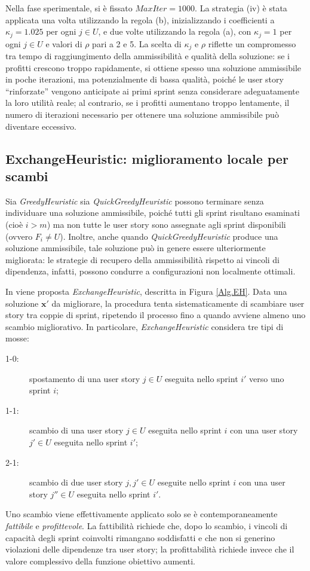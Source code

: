 \documentclass[12pt,a4paper,openright,twoside]{book}
\begin{document}
Nella fase sperimentale, si è fissato $\textit{MaxIter}=1000$. La strategia (iv) è stata applicata una volta utilizzando la regola (b), inizializzando i coefficienti a $\kappa_j = 1.025$ per ogni $j \in U$, e due volte utilizzando la regola (a), con $\kappa_j = 1$ per ogni $j \in U$ e valori di $\rho$ pari a 2 e 5. La scelta di $\kappa_j$ e $\rho$ riflette un compromesso tra tempo di raggiungimento della ammissibilità e qualità della soluzione: se i profitti crescono troppo rapidamente, si ottiene spesso una soluzione ammissibile in poche iterazioni, ma potenzialmente di bassa qualità, poiché le user story ``rinforzate'' vengono anticipate ai primi sprint senza considerare adeguatamente la loro utilità reale; al contrario, se i profitti aumentano troppo lentamente, il numero di iterazioni necessario per ottenere una soluzione ammissibile può diventare eccessivo.


\subsection{ExchangeHeuristic: miglioramento locale per scambi}

Sia {\em GreedyHeuristic} sia {\em QuickGreedyHeuristic} possono terminare senza individuare una soluzione ammissibile, poiché tutti gli sprint risultano esaminati (cioè $i > m$) ma non tutte le user story sono assegnate agli sprint disponibili (ovvero $F_i \neq U$). Inoltre, anche quando {\em QuickGreedyHeuristic} produce una soluzione ammissibile, tale soluzione può in genere essere ulteriormente migliorata: le strategie di recupero della ammissibilità rispetto ai vincoli di dipendenza, infatti, possono condurre a configurazioni non localmente ottimali.

In \cite{BOSCHETTI2014116} viene proposta \emph{ExchangeHeuristic}, descritta in Figura \ref{Alg.EH}. Data una soluzione $\mathbf{x}'$ da migliorare, la procedura tenta sistematicamente di scambiare user story tra coppie di sprint, ripetendo il processo fino a quando avviene almeno uno scambio migliorativo. In particolare, {\em ExchangeHeuristic} considera tre tipi di mosse:
\begin{description}
\item[1-0:] spostamento di una user story $j \in U$ eseguita nello sprint $i'$ verso uno sprint $i$;
\item[1-1:] scambio di una user story $j \in U$ eseguita nello sprint $i$ con una user story $j' \in U$ eseguita nello sprint $i'$;
\item[2-1:] scambio di due user story $j, j' \in U$ eseguite nello sprint $i$ con una user story $j'' \in U$ eseguita nello sprint $i'$.
\end{description}
Uno scambio viene effettivamente applicato solo se è contemporaneamente {\em fattibile} e {\em profittevole}. La fattibilità richiede che, dopo lo scambio, i vincoli di capacità degli sprint coinvolti rimangano soddisfatti e che non si generino violazioni delle dipendenze tra user story; la profittabilità richiede invece che il valore complessivo della funzione obiettivo aumenti.
\end{document}
